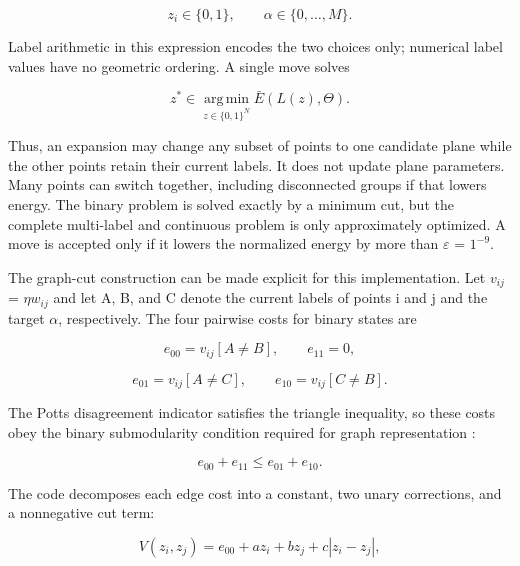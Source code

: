\begin{equation}
z_i\in\{0,1\},\qquad\alpha\in\{0,\ldots,M\}.
\label{eq:25}
\end{equation}

Label arithmetic in this expression encodes the two choices only; numerical label values have no geometric ordering. A single move solves

\begin{equation}
z^*\in\operatorname*{arg\,min}_{z\in\{0,1\}^N}\bar E(L(z),\Theta).
\label{eq:26}
\end{equation}

Thus, an expansion may change any subset of points to one candidate plane while the other points retain their current labels. It does not update plane parameters. Many points can switch together, including disconnected groups if that lowers energy. The binary problem is solved exactly by a minimum cut, but the complete multi-label and continuous problem is only approximately optimized. A move is accepted only if it lowers the normalized energy by more than \(\varepsilon\) = \(1^{-9}\).

The graph-cut construction can be made explicit for this implementation. Let \(v_{ij}\) = \(\eta\)\(w_{ij}\) and let A, B, and C denote the current labels of points i and j and the target \(\alpha\), respectively. The four pairwise costs for binary states are

\begin{equation}
e_{00}=v_{ij}[A\ne B],\qquad e_{11}=0,
\label{eq:27}
\end{equation}

\begin{equation}
e_{01}=v_{ij}[A\ne C],\qquad e_{10}=v_{ij}[C\ne B].
\label{eq:28}
\end{equation}

The Potts disagreement indicator satisfies the triangle inequality, so these costs obey the binary submodularity condition required for graph representation \cite{kolmogorov2004energy}:

\begin{equation}
e_{00}+e_{11}\leq e_{01}+e_{10}.
\label{eq:29}
\end{equation}

The code decomposes each edge cost into a constant, two unary corrections, and a nonnegative cut term:

\begin{equation}
V(z_i,z_j)=e_{00}+az_i+bz_j+c|z_i-z_j|,
\label{eq:30}
\end{equation}

